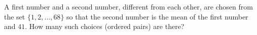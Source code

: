 A first number and a second number, different from each other, are chosen from the set $\{1,2,\dots,68\}$ so that the second number is the mean of the first number and $41$. How many such choices (ordered pairs) are there?
